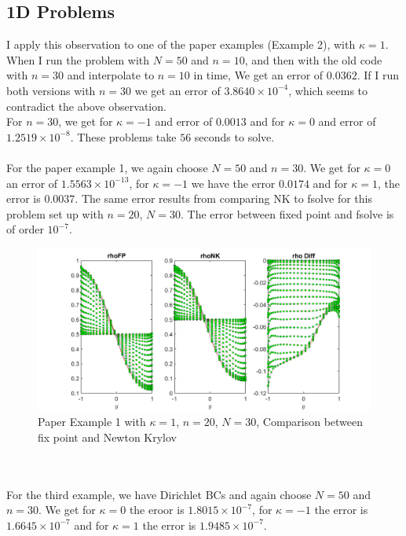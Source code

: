 \documentclass[11pt, a4paper]{article}
\theoremstyle{definition}
\begin{document}
\subsection{1D Problems}
I apply this observation to one of the paper examples (Example 2), with $\kappa = 1$. When I run the problem with $N = 50$ and $n = 10$, and then with the old code with $n = 30$ and interpolate to $n = 10$ in time, We get an error of $0.0362$. If I run both versions with $n = 30$ we get an error of $3.8640 \times 10^{-4}$, which seems to contradict the above observation. \\
For $n = 30$, we get for $\kappa =-1$ and error of $0.0013$ and for $\kappa = 0$ and error of $1.2519 \times 10^{-8}$. These problems take $56$ seconds to solve.
\\
\\
For the paper example 1, we again choose $N = 50$ and $n = 30$. We get for $\kappa = 0$ an error of $1.5563 \times 10^{-13}$, for $\kappa = -1$ we have the error $0.0174$ and for $\kappa = 1$, the error is $0.0037$. The same error results from comparing NK to fsolve for this problem set up with $n = 20$, $N = 30$. The error between fixed point and fsolve is of order $10^{-7}$.
	\begin{figure}[h]
		\centering
		\includegraphics[scale=0.35]{Ex1.png}
		\caption{Paper Example 1 with $\kappa = 1$, $n = 20$, $N = 30$, Comparison between fix point and Newton Krylov} 
		\label{F1}
	\end{figure}
\\
\\
For the third example, we have Dirichlet BCs and again choose $N = 50$ and $n = 30$. We get for $\kappa = 0$ the eroor is $1.8015 \times 10^{-7}$, for $\kappa = -1$ the error is $1.6645 \times 10^{-7}$ and for $\kappa  =1$ the error is $1.9485 \times 10^{-7}$.
\end{document}
